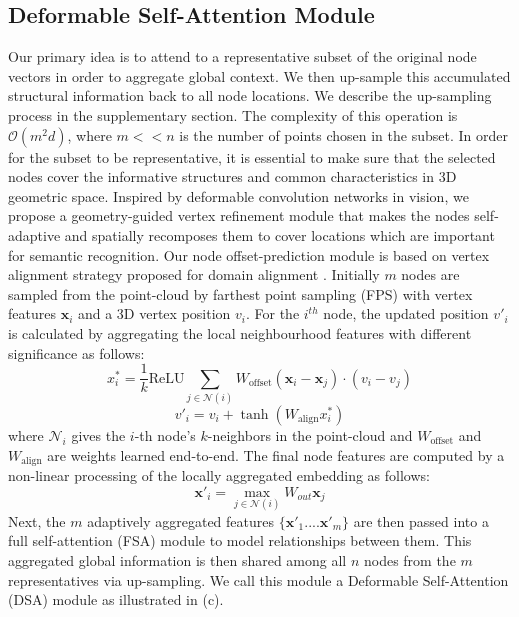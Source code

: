 \documentclass[10pt,twocolumn,letterpaper]{article}
\begin{document}
\subsection{Deformable Self-Attention Module}
 Our primary idea is to attend to a representative subset of the original node vectors in order to aggregate global context. We then up-sample this accumulated structural information back to all node locations. We describe the up-sampling process in the supplementary section. The complexity of this operation is $\mathcal{O}(m^2d)$, where $m << n$ is the number of points chosen in the subset. In order for the subset to be representative, it is essential to make sure that the selected nodes cover the informative structures and common characteristics in 3D geometric space. Inspired by deformable convolution networks \cite{DCN} in vision, we propose a geometry-guided vertex refinement module that makes the nodes self-adaptive and spatially recomposes them to cover locations which are important for semantic recognition. Our node offset-prediction module is based on vertex alignment strategy proposed for domain alignment \cite{Pointdan, meshrcnn}. Initially $m$ nodes are sampled from the point-cloud by farthest point sampling (FPS) with vertex features $\textbf{x}_i$ and a 3D vertex position $v_i$. For the $i^{th}$ node, the updated position $v'_i$ is calculated by aggregating the local neighbourhood features with different significance as follows:
\begin{equation}
x^*_i = \frac{1}{k} \text{ReLU} \sum_{j \in \mathcal{N}(i)}{W_{\text{offset}}(\textbf{x}_i-\textbf{x}_j)\cdot(v_i-v_j)} 
\end{equation}
\begin{equation}
v'_i = v_i+ \tanh(W_\text{align}x^*_i)
\end{equation}
where $\mathcal{N}_i$ gives the $i$-th node's $k$-neighbors in the point-cloud and $W_\text{offset}$ and $
W_\text{align}$ are weights learned end-to-end. The final node features are computed by a non-linear processing of the locally aggregated embedding as follows:
\begin{equation}
\textbf{x}'_i = \max_{j \in \mathcal{N}(i)}W_{out}\textbf{x}_j 
\end{equation}
Next, the $m$ adaptively aggregated features $\{\textbf{x}'_1....\textbf{x}'_m\}$ are then passed into a full self-attention (FSA) module to model relationships between them.
This aggregated global information is then shared among all $n$ nodes from the $m$ representatives via up-sampling. We call this module a Deformable Self-Attention (DSA) module as illustrated in (c). 
\end{document}
